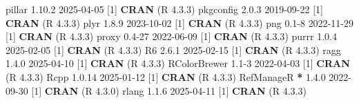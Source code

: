 \documentclass[
]{article}
\newenvironment{Shaded}{\begin{snugshade}}{\end{snugshade}}
\newcommand{\DecValTok}[1]{\textcolor[rgb]{0.00,0.00,0.81}{#1}}
\newcommand{\FloatTok}[1]{\textcolor[rgb]{0.00,0.00,0.81}{#1}}
\newcommand{\FunctionTok}[1]{\textcolor[rgb]{0.13,0.29,0.53}{\textbf{#1}}}
\newcommand{\NormalTok}[1]{#1}
\newcommand{\SpecialCharTok}[1]{\textcolor[rgb]{0.81,0.36,0.00}{\textbf{#1}}}
\begin{document}
\begin{Shaded}
\begin{Highlighting}[]
\NormalTok{ pillar          }\DecValTok{1}\NormalTok{.}\FloatTok{10.2}  \DecValTok{2025{-}04{-}05}\NormalTok{ [}\DecValTok{1}\NormalTok{] }\FunctionTok{CRAN}\NormalTok{ (R }\DecValTok{4}\NormalTok{.}\FloatTok{3.3}\NormalTok{)}
\NormalTok{ pkgconfig       }\DecValTok{2}\NormalTok{.}\FloatTok{0.3}   \DecValTok{2019{-}09{-}22}\NormalTok{ [}\DecValTok{1}\NormalTok{] }\FunctionTok{CRAN}\NormalTok{ (R }\DecValTok{4}\NormalTok{.}\FloatTok{3.3}\NormalTok{)}
\NormalTok{ plyr            }\DecValTok{1}\NormalTok{.}\FloatTok{8.9}   \DecValTok{2023{-}10{-}02}\NormalTok{ [}\DecValTok{1}\NormalTok{] }\FunctionTok{CRAN}\NormalTok{ (R }\DecValTok{4}\NormalTok{.}\FloatTok{3.3}\NormalTok{)}
\NormalTok{ png             }\FloatTok{0.1}\DecValTok{{-}8}   \DecValTok{2022{-}11{-}29}\NormalTok{ [}\DecValTok{1}\NormalTok{] }\FunctionTok{CRAN}\NormalTok{ (R }\DecValTok{4}\NormalTok{.}\FloatTok{3.3}\NormalTok{)}
\NormalTok{ proxy           }\FloatTok{0.4}\DecValTok{{-}27}  \DecValTok{2022{-}06{-}09}\NormalTok{ [}\DecValTok{1}\NormalTok{] }\FunctionTok{CRAN}\NormalTok{ (R }\DecValTok{4}\NormalTok{.}\FloatTok{3.3}\NormalTok{)}
\NormalTok{ purrr           }\DecValTok{1}\NormalTok{.}\FloatTok{0.4}   \DecValTok{2025{-}02{-}05}\NormalTok{ [}\DecValTok{1}\NormalTok{] }\FunctionTok{CRAN}\NormalTok{ (R }\DecValTok{4}\NormalTok{.}\FloatTok{3.3}\NormalTok{)}
\NormalTok{ R6              }\DecValTok{2}\NormalTok{.}\FloatTok{6.1}   \DecValTok{2025{-}02{-}15}\NormalTok{ [}\DecValTok{1}\NormalTok{] }\FunctionTok{CRAN}\NormalTok{ (R }\DecValTok{4}\NormalTok{.}\FloatTok{3.3}\NormalTok{)}
\NormalTok{ ragg            }\DecValTok{1}\NormalTok{.}\FloatTok{4.0}   \DecValTok{2025{-}04{-}10}\NormalTok{ [}\DecValTok{1}\NormalTok{] }\FunctionTok{CRAN}\NormalTok{ (R }\DecValTok{4}\NormalTok{.}\FloatTok{3.3}\NormalTok{)}
\NormalTok{ RColorBrewer    }\FloatTok{1.1}\DecValTok{{-}3}   \DecValTok{2022{-}04{-}03}\NormalTok{ [}\DecValTok{1}\NormalTok{] }\FunctionTok{CRAN}\NormalTok{ (R }\DecValTok{4}\NormalTok{.}\FloatTok{3.3}\NormalTok{)}
\NormalTok{ Rcpp            }\DecValTok{1}\NormalTok{.}\FloatTok{0.14}  \DecValTok{2025{-}01{-}12}\NormalTok{ [}\DecValTok{1}\NormalTok{] }\FunctionTok{CRAN}\NormalTok{ (R }\DecValTok{4}\NormalTok{.}\FloatTok{3.3}\NormalTok{)}
\NormalTok{ RefManageR    }\SpecialCharTok{*} \DecValTok{1}\NormalTok{.}\FloatTok{4.0}   \DecValTok{2022{-}09{-}30}\NormalTok{ [}\DecValTok{1}\NormalTok{] }\FunctionTok{CRAN}\NormalTok{ (R }\DecValTok{4}\NormalTok{.}\FloatTok{3.0}\NormalTok{)}
\NormalTok{ rlang           }\DecValTok{1}\NormalTok{.}\FloatTok{1.6}   \DecValTok{2025{-}04{-}11}\NormalTok{ [}\DecValTok{1}\NormalTok{] }\FunctionTok{CRAN}\NormalTok{ (R }\DecValTok{4}\NormalTok{.}\FloatTok{3.3}\NormalTok{)}

\end{Highlighting}
\end{Shaded}
\end{document}
